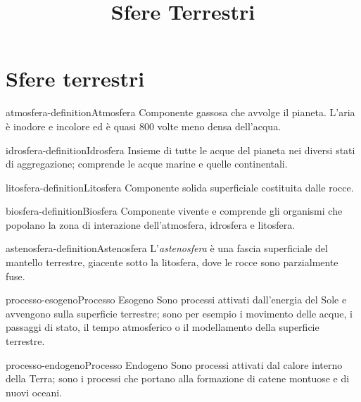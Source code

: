 \documentclass[preview]{standalone}
\begin{document}
\title{Sfere Terrestri}
\genpage

\section{Sfere terrestri}


\begin{snippetdefinition}{atmosfera-definition}{Atmosfera}
    Componente gassosa che avvolge il pianeta. L'aria è inodore e incolore ed è quasi 800 volte meno densa dell'acqua.
\end{snippetdefinition}

\begin{snippetdefinition}{idrosfera-definition}{Idrosfera}
    Insieme di tutte le acque del pianeta nei diversi stati di aggregazione; comprende le acque marine e quelle continentali.
\end{snippetdefinition}
    
\begin{snippetdefinition}{litosfera-definition}{Litosfera}
    Componente solida superficiale costituita dalle rocce.
\end{snippetdefinition}

\begin{snippetdefinition}{biosfera-definition}{Biosfera}
    Componente vivente e comprende gli organismi che popolano la zona di interazione dell'atmosfera, idrosfera e litosfera.
\end{snippetdefinition}

\begin{snippetdefinition}{astenosfera-definition}{Astenosfera}
    L'\textit{astenosfera} è una fascia superficiale del mantello terrestre, giacente sotto la litosfera,
    dove le rocce sono parzialmente fuse.
\end{snippetdefinition}

\begin{snippetdefinition}{processo-esogeno}{Processo Esogeno}
    Sono processi attivati dall'energia del Sole e avvengono sulla superficie terrestre; sono per esempio i movimento delle acque, i passaggi di stato, il tempo atmosferico o il modellamento della superficie terrestre.
\end{snippetdefinition}

\begin{snippetdefinition}{processo-endogeno}{Processo Endogeno}
    Sono processi attivati dal calore interno della Terra; sono i processi che portano alla formazione di catene montuose e di nuovi oceani.
\end{snippetdefinition}
\end{document}
